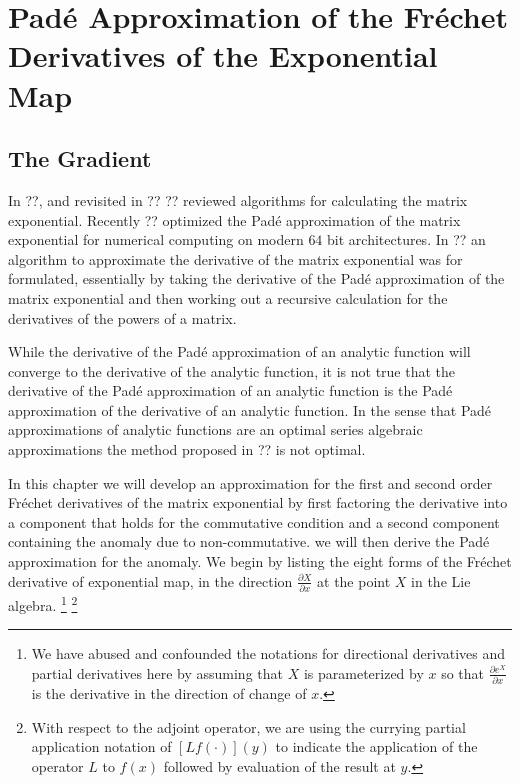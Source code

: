 \chapter{Pad\'{e} Approximation of the Fr\'{e}chet Derivatives of the Exponential Map}
\section{The Gradient}
In ??, and revisited in ?? ?? reviewed algorithms for calculating the matrix 
exponential. Recently ?? optimized the Pad\'{e} approximation of the matrix 
exponential for numerical computing on modern $64$ bit architectures. In ?? an 
algorithm to approximate the derivative of the matrix exponential was for 
formulated, essentially by taking the derivative of the Pad\'{e} approximation 
of the matrix exponential and then working out a recursive calculation for the
derivatives of the powers of a matrix.

While the derivative of the Pad\'{e} approximation of an analytic function will 
converge to the derivative of the analytic function, it is not true that the
derivative of the Pad\'{e} approximation of an analytic function is the Pad\'{e} 
approximation of the derivative of an analytic function. In the sense that 
Pad\'{e} approximations of analytic functions are an optimal series algebraic 
approximations the method proposed in ?? is not optimal.

In this chapter we will develop an approximation for the first and second order
Fr\'{e}chet derivatives of the matrix exponential by first factoring the 
derivative into a component that holds for the commutative condition and a 
second component containing the anomaly due to non-commutative. we will then
derive the Pad\'{e} approximation for the anomaly. We begin by listing the eight 
forms of the Fr\'{e}chet derivative of exponential map, in the direction $\frac{\partial X}{\partial x}$
at the point $X$ in the Lie algebra.
\footnote{We have abused and confounded the notations for directional 
derivatives and partial derivatives here by assuming that $X$ is parameterized 
by $x$ so that $\frac{\partial e^X}{\partial x}$ is the derivative in the
direction of change of $x$.}
\footnote{With respect to the adjoint operator, we are using the currying 
partial application notation of $\left[L f\left(\cdotp\right)\right]\left(y\right)$
to indicate the application of the operator $L$ to $f\left(x\right)$ followed by
evaluation of the result at $y$.}

